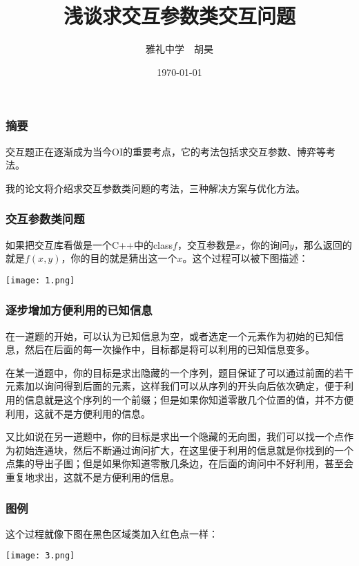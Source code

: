 \documentclass[10pt]{beamer}
\begin{document}
	\title{浅谈求交互参数类交互问题}
	\date{\today}
	\author{雅礼中学~~胡昊}
	\maketitle
	
	\begin{frame}
		\frametitle{摘要}
		
		交互题正在逐渐成为当今OI的重要考点，它的考法包括求交互参数、博弈等考法。

		我的论文将介绍求交互参数类问题的考法，三种解决方案与优化方法。
	\end{frame}
	
	\begin{frame}
		\frametitle{交互参数类问题}
	
		如果把交互库看做是一个C++中的class$f$，交互参数是$x$，你的询问$y$，那么返回的就是$f(x,y)$，你的目的就是猜出这一个$x$。这个过程可以被下图描述：

		\texttt{[image: 1.png]}

	\end{frame}
	
	\begin{frame}
		\frametitle{逐步增加方便利用的已知信息}
		在一道题的开始，可以认为已知信息为空，或者选定一个元素作为初始的已知信息，然后在后面的每一次操作中，目标都是将可以利用的已知信息变多。

		在某一道题中，你的目标是求出隐藏的一个序列，题目保证了可以通过前面的若干元素加以询问得到后面的元素，这样我们可以从序列的开头向后依次确定，便于利用的信息就是这个序列的一个前缀；但是如果你知道零散几个位置的值，并不方便利用，这就不是方便利用的信息。
		
		又比如说在另一道题中，你的目标是求出一个隐藏的无向图，我们可以找一个点作为初始连通块，然后不断通过询问扩大，在这里便于利用的信息就是你找到的一个点集的导出子图；但是如果你知道零散几条边，在后面的询问中不好利用，甚至会重复地求出，这就不是方便利用的信息。
	\end{frame}
	
	\begin{frame}
		\frametitle{图例}
	
		这个过程就像下图在黑色区域类加入红色点一样：

		\texttt{[image: 3.png]}
	\end{frame}
	
\end{document}
